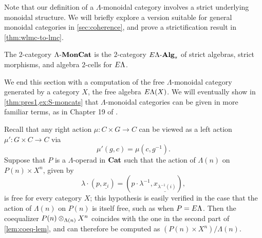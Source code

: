 \begin{rem}\label{rem:strictness-lmc}
Note that our definition of a $\Lambda$-monoidal category involves a strict underlying monoidal structure.
We will briefly explore a version suitable for general monoidal categories in \cref{sec:coherence}, and prove a strictification result in \cref{thm:wlmc-to-lmc}.
\end{rem}

\begin{Defi}
The $2$-category $\lmc$ is the $2$-category $\EL\mbox{-}\mb{Alg}_{s}$ of strict algebras, strict morphisms, and algebra $2$-cells for $\EL$.
\end{Defi}

We end this section with a computation of the free $\Lambda$-monoidal category generated by a category $X$, the free algebra $\EL(X)$.
We will eventually show in \cref{thm:pres1,ex:S-moncats} that $\Lambda$-monoidal categories can be given in more familiar terms, as in Chapter 19 of \cite{yau_infinity_2021}.

\begin{rem}\label{rem:operadcoeq-as-quotient}
Recall that any right action $\mu \colon C \times G \to C$ can be viewed as a left action $\mu' \colon G \times C \to C$ via
\[
\mu'(g,c) = \mu(c, g^{-1}).
\]
Suppose that $P$ is a $\Lambda$-operad in $\mb{Cat}$ such that the action of $\Lambda(n)$ on $P(n) \times X^n$, given by
\[
\lambda \cdot (p, \underline{x_i}) = (p \cdot \lambda^{-1}, \underline{x_{\lambda^{-1}(i)}}),
\]
 is free for every category $X$; this hypothesis is easily verified in the case that the action of $\Lambda(n)$ on $P(n)$ is itself free, such as when $P = \EL$.
 Then the coequalizer $\coeqb{P(n)}{X^n}{\Lambda(n)}$ coincides with the one in the second part of \cref{lem:coeq-lem}, and can therefore be computed as $\left( P(n) \times X^n \right)/\Lambda(n)$.
 \end{rem}


